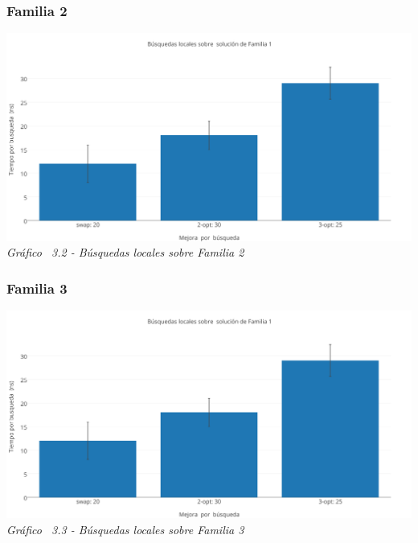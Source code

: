 \subsubsection*{Familia 2}

\vspace*{0.3cm} \vspace*{0.3cm}
  \begin{center}
 \includegraphics[scale=0.5]{./EJ3/local_search_familia.png}
 {            \textit{Gráfico \ 3.2 - Búsquedas locales sobre Familia 2}}
  \end{center}
  \vspace*{0.3cm}

\subsubsection*{Familia 3}

\vspace*{0.3cm} \vspace*{0.3cm}
  \begin{center}
 \includegraphics[scale=0.5]{./EJ3/local_search_familia.png}
 {            \textit{Gráfico \ 3.3 - Búsquedas locales sobre Familia 3}}
  \end{center}
  \vspace*{0.3cm}

